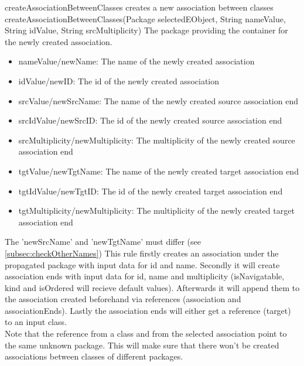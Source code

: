 \op
{createAssociationBetweenClasses}
{creates a new association between classes}
{createAssociationBetweenClasses(Package selectedEObject, String nameValue,
String idValue, String srcMultiplicity)} {The package providing the container
for the newly created association.} {
\begin{itemize}
 \item nameValue/newName: The name of the newly created association
 \item idValue/newID: The id of the newly created association
 \item srcValue/newSrcName: The name of the newly created source association end
 \item srcIdValue/newSrcID: The id of the newly created source association end
 \item srcMultiplicity/newMultiplicity: The multiplicity of the newly created
 source association end
 \item tgtValue/newTgtName: The name of the newly created target association end
 \item tgtIdValue/newTgtID: The id of the newly created target association end
 \item tgtMultiplicity/newMultiplicity: The multiplicity of the newly created
 target association end
\end{itemize}
}
{The 'newSrcName' and 'newTgtName' must differ (see
\ref{subsec:checkOtherNames})}
{This rule firstly creates an association under the propagated package with
input data for id and name. Secondly it will create association ends with input data for id, name and
multiplicity (isNavigatable, kind and isOrdered will recieve default
values). Afterwards it will append them to the association created beforehand
via references (association and associationEnds). Lastly the association
ends will either get a reference (target) to an input class.
\\Note that the reference from a class and from the selected association point to
the same unknown package. This will make sure that there won't be created
associations between classes of different packages.}
